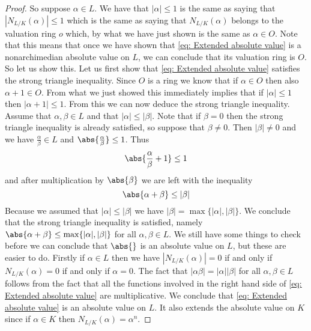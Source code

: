 \documentclass{article}
\numberwithin{equation}{section}
\begin{document}
\begin{proof}
    So suppose $\alpha \in L$. We have that $|\alpha| \leq 1$ is the same as saying that $|N_{L/K}(\alpha)| \leq 1$ which is the same as saying that $N_{L/K}(\alpha)$ belongs to the valuation ring $o$ which, by what we have just shown is the same as $\alpha \in O$. Note that this means that once we have shown that \cref{eq: Extended absolute value} is a nonarchimedian absolute value on $L$, we can conclude that its valuation ring is $O$. So let us show this. Let us first show that \cref{eq: Extended absolute value} satisfies the strong triangle inequality. Since $O$ is a ring we know that if $\alpha \in O$ then also $\alpha + 1 \in O$. From what we just showed this immediately implies that if $|\alpha|\leq 1$ then $|\alpha + 1| \leq 1$. From this we can now deduce the strong triangle inequality. Assume that $\alpha, \beta \in L$ and that $|\alpha| \leq |\beta|$. Note that if $\beta = 0$ then the strong triangle inequality is already satisfied, so suppose that $\beta \neq 0$. Then $|\beta| \neq 0$ and we have $\frac{\alpha}{\beta} \in L$ and $\abs{\frac{\alpha}{\beta}} \leq 1$. Thus
    $$\abs{\frac{\alpha}{\beta} + 1} \leq 1$$
    and after multiplication by $\abs {\beta}$ we are left with the inequality
    $$\abs{\alpha + \beta} \leq |\beta|$$
    Because we assumed that $|\alpha| \leq |\beta|$ we have $|\beta| = \max \{|\alpha|,|\beta| \}$. We conclude that the strong triangle inequality is satisfied, namely
    $\abs{\alpha + \beta} \leq \max\{|\alpha|, |\beta|\}$ for all $\alpha, \beta \in L$. We still have some things to check before we can conclude that $\abs{}$ is an absolute value on $L$, but these are easier to do. Firstly if $\alpha \in L$ then we have $|N_{L/K}(\alpha)| = 0$ if and only if $N_{L/K}(\alpha) = 0$ if and only if $\alpha = 0$. The fact that $|\alpha \beta| = |\alpha| |\beta|$ for all $\alpha,\beta \in L$ follows from the fact that all the functions involved in the right hand side of \cref{eq: Extended absolute value} are multiplicative. We conclude that \cref{eq: Extended absolute value} is an absolute value on $L$. It also extends the absolute value on $K$ since if $\alpha \in K$ then $N_{L/K}(\alpha)= \alpha^n$.


\end{proof}
\end{document}
